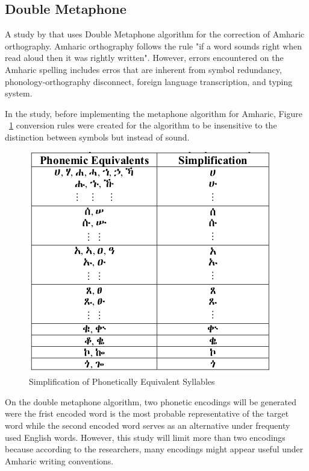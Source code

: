 \documentclass[12pt]{book}
\begin{document}
\begin{enumerate}
\subsection{Double Metaphone}
A study by \cite{yacob2004application} that uses Double Metaphone algorithm for the correction of Amharic orthography. Amharic orthography follows the rule "if a word sounds right when read aloud then it was rightly written". However, errors encountered on the Amharic spelling includes erros that are inherent from symbol redundancy, phonology-orthography disconnect, foreign language transcription, and typing system.

In the study, before implementing the metaphone algorithm for Amharic, Figure ~\ref{amharic} conversion rules were created for the algorithm to be insensitive to the distinction between symbols but instead of sound.

\begin{figure}
\begin{center}	
\includegraphics[scale=.65]{amharic.png}
	\caption[Simplification of Phonetically Equivalent Syllables]
	{ Simplification of Phonetically Equivalent Syllables}	
	\label{amharic}
\end{center}
\end{figure}
	
\end{enumerate}

On the double metaphone algorithm, two phonetic encodings will be generated were the frist encoded word is the most probable representative of the target word while the second encoded word serves as an alternative under frequenty used English words. However, this study will limit more than two encodings because according to the researchers, many encodings might appear useful under Amharic writing conventions.
\end{document}
